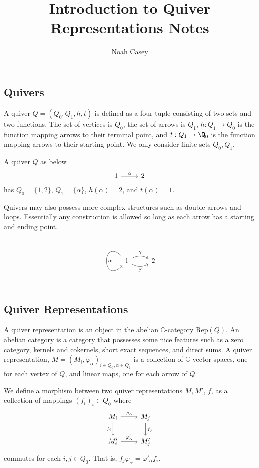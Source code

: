 \documentclass[10pt,a4paper]{report}
\author{Noah Casey}
\title{Introduction to Quiver Representations Notes}
\begin{document}
\subsection*{Quivers}
	\indent A quiver $Q=(Q_{0},Q_{1},h,t)$ is defined as a four-tuple consisting of two sets and two functions. The set of vertices is $Q_{0}$, the set of arrows is $Q_{1}$, $h: Q_{1}\to Q_{0}$ is the function mapping arrows to their terminal point, and $t: Q_{1}\to \Q_{0}$ is the function mapping arrows to their starting point. We only consider finite sets $Q_{0},Q_{1}$.
	
	A quiver $Q$ as below
	\[
		\begin{tikzcd}
		1 \arrow[r,"\alpha"] & 2
		\end{tikzcd}
	\] 
	has $Q_{0}=\{1,2\}$, $Q_{1}=\{\alpha\}$, $h(\alpha) = 2$, and $t(\alpha)=1$.
	
	Quivers may also possess more complex structures such as double arrows and loops. Essentially any construction is allowed so long as each arrow has a starting and ending point. 
	\[
		\begin{tikzcd}
		1 \arrow[out=135,in=225,loop, "\alpha"] \arrow[r,bend left, "\gamma"] \arrow[r,bend right, swap, "\beta"] & 2 
		\end{tikzcd}
	\]
	
\subsection*{Quiver Representations}
	\indent A quiver representation is an object in the abelian $\mathbb{C}$-category Rep$(Q)$. An abelian category is a category that possesses some nice features such as a zero category, kernels and cokernels, short exact sequences, and direct sums. A quiver representation, $M=(M_{i},\varphi_{\alpha})_{i\in Q_{0},\alpha\in Q_{1}}$ is a collection of $\mathbb{C}$ vector spaces, one for each vertex of $Q$, and linear maps, one for each arrow of $Q$. 
	
	We define a morphism between two quiver representations $M,M'$, $f$, as a collection of mappings $(f_{i})_{i}\in Q_{0}$ where 
	\[
		\begin{tikzcd}
		M_{i} \arrow[r,"\varphi_{\alpha}"] \arrow[d,swap,"f_{i}"] & M_{j} \arrow[d,"f_{j}"] \\
		M'_{i} \arrow[r,"\varphi'_{\alpha}"] & M'_{j}
		\end{tikzcd}
	\]
commutes for each $i,j\in Q_{0}$. That is, $f_{j}\varphi_{\alpha}=\varphi'_{\alpha}f_{i}$.
\end{document}
